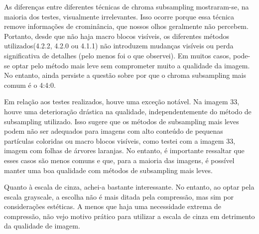 \paragrafo As diferenças entre diferentes técnicas de chroma subsampling mostraram-se, na maioria dos testes, visualmente irrelevantes. Isso ocorre porque essa técnica remove informações de crominância, que nossos olhos geralmente não percebem. Portanto, desde que não haja macro blocos visíveis, os diferentes métodos utilizados(4.2.2, 4.2.0 ou 4.1.1) não introduzem mudanças visíveis ou perda significativa de detalhes (pelo menos foi o que observei). Em muitos casos, pode-se optar pelo método mais leve sem comprometer muito a qualidade da imagem. No entanto, ainda persiste a questão sobre por que o chroma subsampling mais comum é o 4:4:0.

\paragrafo Em relação aos testes realizados, houve uma exceção notável. Na imagem 33, houve uma deterioração drástica na qualidade, independentemente do método de subsampling utilizado. Isso sugere que os métodos de subsampling mais leves podem não ser adequados para imagens com alto conteúdo de pequenas partículas coloridas ou macro blocos visíveis, como testei com a imagem 33, imagem com folhas de árvores laranjas. No entanto, é importante ressaltar que esses casos são menos comuns e que, para a maioria das imagens, é possível manter uma boa qualidade com métodos de subsampling mais leves.

\paragrafo Quanto à escala de cinza, achei-a bastante interessante. No entanto, ao optar pela escala grayscale, a escolha não é mais ditada pela compressão, mas sim por considerações estéticas. A menos que haja uma necessidade extrema de compressão, não vejo motivo prático para utilizar a escala de cinza em detrimento da qualidade de imagem.

